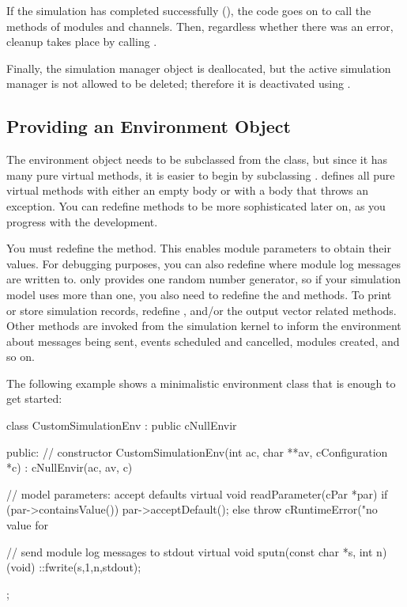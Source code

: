 If the simulation has completed successfully (), the code
goes on to call the  methods of modules and channels. Then,
regardless whether there was an error, cleanup takes place by calling
.

Finally, the simulation manager object is deallocated, but the active
simulation manager is not allowed to be deleted; therefore it is deactivated
using .


\subsection{Providing an Environment Object}
\label{sec:embedding:providing-an-environment-object}

The environment object needs to be subclassed from the  class,
but since it has many pure virtual methods, it is easier
to begin by subclassing .  defines all
pure virtual methods with either an empty body or with a body that throws
an  exception. You can redefine methods
to be more sophisticated later on, as you progress with the development.

You must redefine the  method. This enables
module parameters to obtain their values. For debugging purposes, you can also
redefine  where module log messages are written to.
 only provides one random number generator, so if your
simulation model uses more than one, you also need to redefine the
 and  methods. To print or store
simulation records, redefine , 
and/or the output vector related methods. Other  methods
are invoked from the simulation kernel to inform the environment about
messages being sent, events scheduled and cancelled, modules created, and so on.

The following example shows a minimalistic environment class that is enough
to get started:

\begin{cpp}
class CustomSimulationEnv : public cNullEnvir
{
  public:
    // constructor
    CustomSimulationEnv(int ac, char **av, cConfiguration *c) :
        cNullEnvir(ac, av, c) {}

    // model parameters: accept defaults
    virtual void readParameter(cPar *par) {
        if (par->containsValue())
            par->acceptDefault();
        else
            throw cRuntimeError("no value for %
    }

    // send module log messages to stdout
    virtual void sputn(const char *s, int n) {
        (void) ::fwrite(s,1,n,stdout);
    }
};
\end{cpp}


